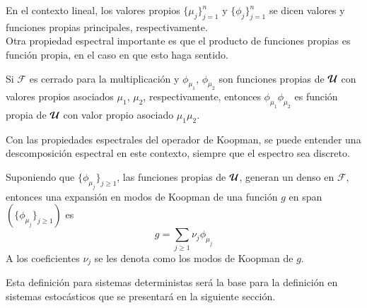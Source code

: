 En el contexto lineal, los valores propios $\{\mu_j\}_{j=1}^n$ y $\{ \phi_j\}_{j=1}^n$ se dicen valores y funciones propias principales, respectivamente. \\
Otra propiedad espectral importante es que el producto de funciones propias es función propia, en el caso en que esto haga sentido.
\begin{prop}
	Si $\mathcal{F}$ es cerrado para la multiplicación y $\phi_{\mu_1}, \, \phi_{\mu_2}$ son funciones propias de $\mathcal{U}$ con valores propios asociados $\mu_1$, $\mu_2$, respectivamente, entonces $\phi_{\mu_1} \phi_{\mu_2}$ es función propia de $\mathcal{U}$ con valor propio asociado $\mu_1 \mu_2$.
\end{prop}
Con las propiedades espectrales del operador de Koopman, se puede entender una descomposición espectral en este contexto, siempre que el espectro sea discreto. 
\begin{defn}
Suponiendo que $\{ \phi_{\mu_j} \}_{j \geq 1}$, las funciones propias de $\mathcal{U}$, generan un denso en $\mathcal{F}$, entonces una expansión en modos de Koopman de una función $g$ en span$(\{ \phi_{\mu_j} \}_{j \geq 1})$ es
	\begin{equation*}
		g = \sum_{j \geq 1} \nu_j \phi_{\mu_j} 
	\end{equation*}
	A los coeficientes $\nu_j$ se les denota como los modos de Koopman de $g$.
\end{defn}
Esta definición para sistemas deterministas será la base para la definición en sistemas estocásticos que se presentará en la siguiente sección.
